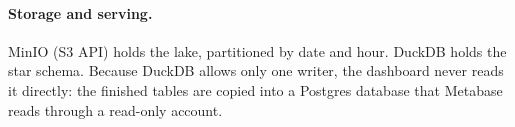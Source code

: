 \paragraph{Storage and serving.} MinIO (S3 API) holds the lake, partitioned by date and hour. DuckDB
holds the star schema. Because DuckDB allows only one writer, the dashboard never reads it directly:
the finished tables are copied into a Postgres database that Metabase reads through a read-only account.

